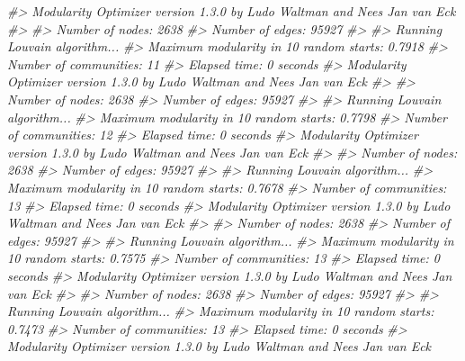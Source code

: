 \documentclass[
]{book}
\newenvironment{Shaded}{\begin{snugshade}}{\end{snugshade}}
\newcommand{\CommentTok}[1]{\textcolor[rgb]{0.56,0.35,0.01}{\textit{#1}}}
\begin{document}
\begin{Shaded}
\begin{Highlighting}[]
\CommentTok{\#\textgreater{} Modularity Optimizer version 1.3.0 by Ludo Waltman and Nees Jan van Eck}
\CommentTok{\#\textgreater{} }
\CommentTok{\#\textgreater{} Number of nodes: 2638}
\CommentTok{\#\textgreater{} Number of edges: 95927}
\CommentTok{\#\textgreater{} }
\CommentTok{\#\textgreater{} Running Louvain algorithm...}
\CommentTok{\#\textgreater{} Maximum modularity in 10 random starts: 0.7918}
\CommentTok{\#\textgreater{} Number of communities: 11}
\CommentTok{\#\textgreater{} Elapsed time: 0 seconds}
\CommentTok{\#\textgreater{} Modularity Optimizer version 1.3.0 by Ludo Waltman and Nees Jan van Eck}
\CommentTok{\#\textgreater{} }
\CommentTok{\#\textgreater{} Number of nodes: 2638}
\CommentTok{\#\textgreater{} Number of edges: 95927}
\CommentTok{\#\textgreater{} }
\CommentTok{\#\textgreater{} Running Louvain algorithm...}
\CommentTok{\#\textgreater{} Maximum modularity in 10 random starts: 0.7798}
\CommentTok{\#\textgreater{} Number of communities: 12}
\CommentTok{\#\textgreater{} Elapsed time: 0 seconds}
\CommentTok{\#\textgreater{} Modularity Optimizer version 1.3.0 by Ludo Waltman and Nees Jan van Eck}
\CommentTok{\#\textgreater{} }
\CommentTok{\#\textgreater{} Number of nodes: 2638}
\CommentTok{\#\textgreater{} Number of edges: 95927}
\CommentTok{\#\textgreater{} }
\CommentTok{\#\textgreater{} Running Louvain algorithm...}
\CommentTok{\#\textgreater{} Maximum modularity in 10 random starts: 0.7678}
\CommentTok{\#\textgreater{} Number of communities: 13}
\CommentTok{\#\textgreater{} Elapsed time: 0 seconds}
\CommentTok{\#\textgreater{} Modularity Optimizer version 1.3.0 by Ludo Waltman and Nees Jan van Eck}
\CommentTok{\#\textgreater{} }
\CommentTok{\#\textgreater{} Number of nodes: 2638}
\CommentTok{\#\textgreater{} Number of edges: 95927}
\CommentTok{\#\textgreater{} }
\CommentTok{\#\textgreater{} Running Louvain algorithm...}
\CommentTok{\#\textgreater{} Maximum modularity in 10 random starts: 0.7575}
\CommentTok{\#\textgreater{} Number of communities: 13}
\CommentTok{\#\textgreater{} Elapsed time: 0 seconds}
\CommentTok{\#\textgreater{} Modularity Optimizer version 1.3.0 by Ludo Waltman and Nees Jan van Eck}
\CommentTok{\#\textgreater{} }
\CommentTok{\#\textgreater{} Number of nodes: 2638}
\CommentTok{\#\textgreater{} Number of edges: 95927}
\CommentTok{\#\textgreater{} }
\CommentTok{\#\textgreater{} Running Louvain algorithm...}
\CommentTok{\#\textgreater{} Maximum modularity in 10 random starts: 0.7473}
\CommentTok{\#\textgreater{} Number of communities: 13}
\CommentTok{\#\textgreater{} Elapsed time: 0 seconds}
\CommentTok{\#\textgreater{} Modularity Optimizer version 1.3.0 by Ludo Waltman and Nees Jan van Eck}

\end{Highlighting}
\end{Shaded}
\end{document}

